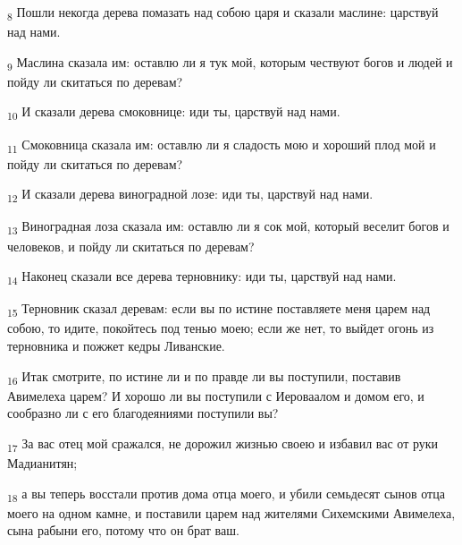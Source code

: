 \begin{tcolorbox}
\textsubscript{8} Пошли некогда дерева помазать над собою царя и сказали маслине: царствуй над нами.
\end{tcolorbox}
\begin{tcolorbox}
\textsubscript{9} Маслина сказала им: оставлю ли я тук мой, которым чествуют богов и людей и пойду ли скитаться по деревам?
\end{tcolorbox}
\begin{tcolorbox}
\textsubscript{10} И сказали дерева смоковнице: иди ты, царствуй над нами.
\end{tcolorbox}
\begin{tcolorbox}
\textsubscript{11} Смоковница сказала им: оставлю ли я сладость мою и хороший плод мой и пойду ли скитаться по деревам?
\end{tcolorbox}
\begin{tcolorbox}
\textsubscript{12} И сказали дерева виноградной лозе: иди ты, царствуй над нами.
\end{tcolorbox}
\begin{tcolorbox}
\textsubscript{13} Виноградная лоза сказала им: оставлю ли я сок мой, который веселит богов и человеков, и пойду ли скитаться по деревам?
\end{tcolorbox}
\begin{tcolorbox}
\textsubscript{14} Наконец сказали все дерева терновнику: иди ты, царствуй над нами.
\end{tcolorbox}
\begin{tcolorbox}
\textsubscript{15} Терновник сказал деревам: если вы по истине поставляете меня царем над собою, то идите, покойтесь под тенью моею; если же нет, то выйдет огонь из терновника и пожжет кедры Ливанские.
\end{tcolorbox}
\begin{tcolorbox}
\textsubscript{16} Итак смотрите, по истине ли и по правде ли вы поступили, поставив Авимелеха царем? И хорошо ли вы поступили с Иероваалом и домом его, и сообразно ли с его благодеяниями поступили вы?
\end{tcolorbox}
\begin{tcolorbox}
\textsubscript{17} За вас отец мой сражался, не дорожил жизнью своею и избавил вас от руки Мадианитян;
\end{tcolorbox}
\begin{tcolorbox}
\textsubscript{18} а вы теперь восстали против дома отца моего, и убили семьдесят сынов отца моего на одном камне, и поставили царем над жителями Сихемскими Авимелеха, сына рабыни его, потому что он брат ваш.
\end{tcolorbox}
